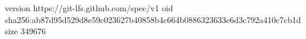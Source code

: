 version https://git-lfs.github.com/spec/v1
oid sha256:ab87d95d529d8e59c023627b40858b4c664b0886323633e6d3c792a410c7cb1d
size 349676
